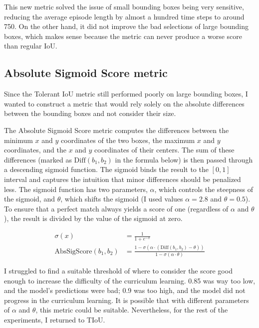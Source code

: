 \documentclass[
  digital,     %
  oneside,     %
  nosansbold,  %
  nocolorbold, %
  lof,         %
  lot,         %
]{fithesis4}
\begin{document}
This new metric solved the issue of small bounding boxes being very sensitive, reducing the average episode length by almost a hundred time steps to around 750. On the other hand, it did not improve the bad selections of large bounding boxes, which makes sense because the metric can never produce a worse score than regular IoU.

\subsection{Absolute Sigmoid Score metric}

Since the Tolerant IoU metric still performed poorly on large bounding boxes, I wanted to construct a metric that would rely solely on the absolute differences between the bounding boxes and not consider their size.

The Absolute Sigmoid Score metric computes the differences between the minimum $x$ and $y$ coordinates of the two boxes, the maximum $x$ and $y$ coordinates, and the $x$ and $y$ coordinates of their centers. The sum of these differences (marked as $\text{Diff}( b_1, b_2)$ in the formula below) is then passed through a descending sigmoid function. The sigmoid binds the result to the $[0,1]$ interval and captures the intuition that minor differences should be penalized less. The sigmoid function has two parameters, $\alpha$, which controls the steepness of the sigmoid, and $\theta$, which shifts the sigmoid (I used values $\alpha = 2.8$ and $\theta = 0.5$). To ensure that a perfect match always yields a score of one (regardless of $\alpha$ and $\theta$), the result is divided by the value of the sigmoid at zero.

\begin{equation}
\begin{split}
    \sigma(x) & = \frac{1}{1+e^{-x}} \\
    \text{AbsSigScore}( b_1, b_2) & = \frac{1-\sigma(\alpha\cdot(\text{Diff}( b_1, b_2)-\theta))}{1-\sigma(\alpha\cdot\theta)}
\end{split}
\end{equation}

I struggled to find a suitable threshold of where to consider the score good enough to increase the difficulty of the curriculum learning. 0.85 was way too low, and the model's predictions were bad; 0.9 was too high, and the model did not progress in the curriculum learning. It is possible that with different parameters of $\alpha$ and $\theta$, this metric could be suitable. Nevertheless, for the rest of the experiments, I returned to TIoU.
\end{document}

